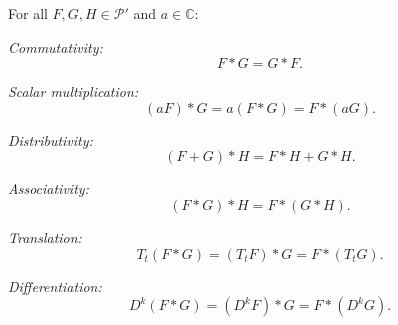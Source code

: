 For all $F, G, H \in \mathcal{P}'$ and $a \in \mathbb{C}$:

\textit{Commutativity:}
$$F * G = G * F.$$

\textit{Scalar multiplication:}
$$(aF) * G = a(F * G) = F * (aG).$$

\textit{Distributivity:}
$$(F + G) * H = F * H + G * H.$$

\textit{Associativity:}
$$(F * G) * H = F * (G * H).$$

\textit{Translation:}
$$T_t(F * G) = (T_t F) * G = F * (T_t G).$$

\textit{Differentiation:}
$$D^k(F * G) = (D^k F) * G = F * (D^k G).$$
